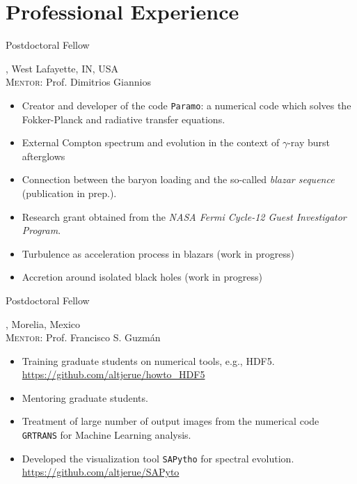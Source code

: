 %
\section{Professional Experience}

%
{\DPA}{Postdoctoral Fellow}{}{}%
{\Purdue, West Lafayette, IN, USA\\
  \textsc{Mentor}: Prof. Dimitrios Giannios%
  \begin{itemize}
    \item Creator and developer of the code \texttt{Paramo}: a numerical code which solves the Fokker-Planck and radiative transfer equations.
    \item External Compton spectrum and evolution in the context of $\gamma$-ray burst afterglows \cite{Zhang:2020ch}
    \item Connection between the baryon loading and the so-called \emph{blazar sequence} (publication in prep.).
    \item Research grant obtained from the \textit{NASA Fermi Cycle-12 Guest Investigator Program}.
    \item Turbulence as acceleration process in blazars (work in progress)
    \item Accretion around isolated black holes (work in progress)
  \end{itemize}
}
%
{\IFMes}{Postdoctoral Fellow}{}{}%
{\UMSNHes, Morelia, Mexico\\
  \textsc{Mentor}: Prof. Francisco S. Guzmán%
  \begin{itemize}
    \item Training graduate students on numerical tools, e.g., HDF5. \url{https://github.com/altjerue/howto_HDF5}
    \item Mentoring graduate students.
    \item Treatment of large number of output images from the numerical code \texttt{GRTRANS} for Machine Learning analysis.
    \item Developed the visualization tool \texttt{SAPytho} for spectral evolution. \url{https://github.com/altjerue/SAPyto}
  \end{itemize}
}
